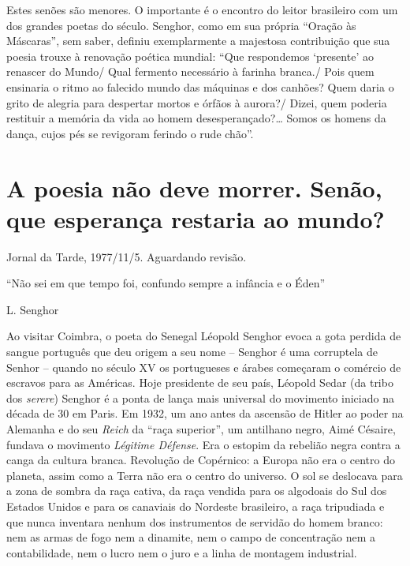 \documentclass[
  letterpaper,
  DIV=11,
  numbers=noendperiod]{scrreprt}
\begin{document}
Estes senões são menores. O importante é o encontro do leitor brasileiro
com um dos grandes poetas do século. Senghor, como em sua própria
``Oração às Máscaras'', sem saber, definiu exemplarmente a majestosa
contribuição que sua poesia trouxe à renovação poética mundial: ``Que
respondemos `presente' ao renascer do Mundo/ Qual fermento necessário à
farinha branca./ Pois quem ensinaria o ritmo ao falecido mundo das
máquinas e dos canhões? Quem daria o grito de alegria para despertar
mortos e órfãos à aurora?/ Dizei, quem poderia restituir a memória da
vida ao homem desesperançado?\ldots{} Somos os homens da dança, cujos
pés se revigoram ferindo o rude chão''.

\chapter{A poesia não deve morrer. Senão, que esperança restaria ao
mundo?}\label{a-poesia-nuxe3o-deve-morrer.-senuxe3o-que-esperanuxe7a-restaria-ao-mundo}

Jornal da Tarde, 1977/11/5. Aguardando revisão.

\hfill\break

``Não sei em que tempo foi, confundo sempre a infância e o Éden''

L. Senghor

Ao visitar Coimbra, o poeta do Senegal Léopold Senghor evoca a gota
perdida de sangue português que deu origem a seu nome -- Senghor é uma
corruptela de Senhor -- quando no século XV os portugueses e árabes
começaram o comércio de escravos para as Américas. Hoje presidente de
seu país, Léopold Sedar (da tribo dos \emph{serere}) Senghor é a ponta
de lança mais universal do movimento iniciado na década de 30 em Paris.
Em 1932, um ano antes da ascensão de Hitler ao poder na Alemanha e do
seu \emph{Reich} da ``raça superior'', um antilhano negro, Aimé Césaire,
fundava o movimento \emph{Légitime Défense}. Era o estopim da rebelião
negra contra a canga da cultura branca. Revolução de Copérnico: a Europa
não era o centro do planeta, assim como a Terra não era o centro do
universo. O sol se deslocava para a zona de sombra da raça cativa, da
raça vendida para os algodoais do Sul dos Estados Unidos e para os
canaviais do Nordeste brasileiro, a raça tripudiada e que nunca
inventara nenhum dos instrumentos de servidão do homem branco: nem as
armas de fogo nem a dinamite, nem o campo de concentração nem a
contabilidade, nem o lucro nem o juro e a linha de montagem industrial.
\end{document}
